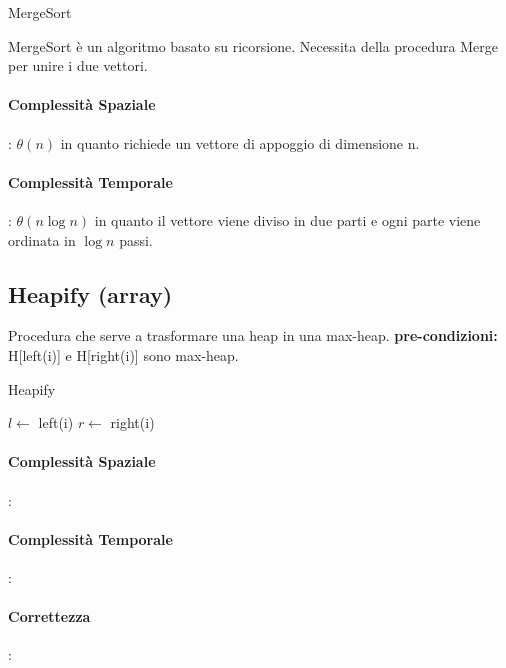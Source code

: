 \documentclass{article}
\DeclarePairedDelimiter\floor{\lfloor}{\rfloor}
\begin{document}
\begin{algorithm}[H]
\caption{MergeSort}
\end{algorithm}

MergeSort è un algoritmo basato su ricorsione. Necessita della procedura Merge per unire i due vettori.

\paragraph{Complessità Spaziale}: $\theta(n)$ in quanto richiede un vettore di appoggio di dimensione n.

\paragraph{Complessità Temporale}: $\theta(n \log n)$ in quanto il vettore viene diviso in due parti e
ogni parte viene ordinata in $\log n$ passi.

\subsection{Heapify (array)} %
Procedura che serve a trasformare una heap in una max-heap. \newline
\textbf{pre-condizioni:} H[left(i)] e H[right(i)] sono max-heap.


\begin{algorithm}[H]
\caption{Heapify}
$l \leftarrow$ left(i)\;
$r \leftarrow$ right(i)\;
\end{algorithm}

\paragraph{Complessità Spaziale}: 
\paragraph{Complessità Temporale}:
\paragraph{Correttezza}:
\end{document}
